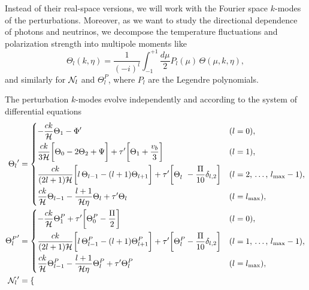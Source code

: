 \documentclass[10pt,a4paper]{article}
\begin{document}
Instead of their real-space versions,
we will work with the Fourier space $k$-modes of the perturbations.
Moreover, as we want to study the directional dependence of photons and neutrinos,
we decompose the temperature fluctuations and polarization strength into multipole moments like
\begin{equation}
	\Theta_l(k,\eta) = \frac{1}{(-i)^l} \int_{-1}^{+1} \frac{d\mu}{2} P_l(\mu) \, \Theta(\mu,k,\eta),
\end{equation}
and similarly for $\mathcal{N}_l$ and $\Theta^P_l$,
where $P_l$ are the Legendre polynomials.

The perturbation $k$-modes evolve independently and according to the system of differential equations
\begin{subequations}
\allowdisplaybreaks
\begin{align}
	{\Theta_l}^\prime   &= \begin{dcases}
	                       -\frac{ck}{\aH} \Theta_1 - \Phi^\prime & (l=0), \\
	                       \frac{ck}{3\aH} \bigg[ \Theta_0 - 2 \Theta_2 + \Psi \bigg] + \tau^\prime \bigg[ \Theta_1 + \frac{v_b}{3} \bigg] & (l=1), \\
	                       \frac{ck}{(2l+1)\aH} \bigg[ l \, \Theta_{l-1} - (l+1) \Theta_{l+1} \bigg] + \tau^\prime \bigg[ \Theta^{\phantom{P}}_l - \frac{\Pi}{10} \delta_{l,2} \bigg] & (l = 2,\, \ldots,\, l_\text{max}-1), \\
	                       \frac{ck}{\aH} \Theta_{l-1} - \frac{l+1}{\aH \eta} \Theta_l + \tau^\prime \Theta_l & (l=l_\text{max}), \\
	                       \end{dcases} \\
	{\Theta^P_l}^\prime &= \begin{dcases}
	                       -\frac{ck}{\aH} \Theta^P_1 + \tau^\prime \bigg[ \Theta^P_0 - \frac{\Pi}{2} \bigg] & (l=0), \\
	                       \frac{ck}{(2l+1)\aH} \bigg[ l \, \Theta^P_{l-1} - (l+1) \Theta^P_{l+1} \bigg] + \tau^\prime \bigg[ \Theta^P_l - \frac{\Pi}{10} \delta_{l,2} \bigg] & (l = 1,\, \ldots,\, l_\text{max}-1), \\
	                       \frac{ck}{\aH} \Theta^P_{l-1} - \frac{l+1}{\aH \eta} \Theta^P_l + \tau^\prime \Theta^P_l & (l=l_\text{max}), \\
	                       \end{dcases} \\
	{\N_l}^\prime       &= \begin{dcases}

\end{dcases}
\end{align}
\end{subequations}
\end{document}

